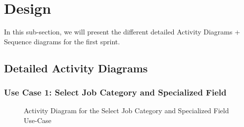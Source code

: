\section{Design} 
In this sub-section, we will present the different detailed Activity Diagrams + Sequence diagrams for the first sprint.

\newpage
\subsection{Detailed Activity Diagrams}
\subsubsection{Use Case 1: Select Job Category and Specialized Field} 


\begin{figure}[H]
    \centering
    \caption{ Activity Diagram for the Select Job Category and Specialized Field Use-Case }
    \label{fig:UseCase1Sprint2_Activity_Diagram}
\end{figure}



